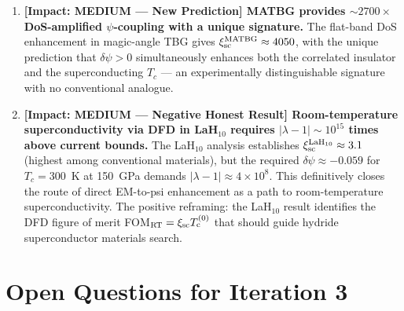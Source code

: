 \documentclass[11pt]{article}
\newcommand{\ee}[1]{\times 10^{#1}}
\newcommand{\Tc}{T_{\rm c}}
\begin{document}
\begin{enumerate}[leftmargin=*]
\item \textbf{[Impact: MEDIUM --- New Prediction] MATBG provides $\sim 2700\times$
  DoS-amplified $\psi$-coupling with a unique signature.}
  The flat-band DoS enhancement in magic-angle TBG gives
  $\xi_{\rm sc}^{\rm MATBG} \approx 4050$, with the unique prediction
  that $\delta\psi > 0$ simultaneously enhances both the correlated insulator
  and the superconducting $T_c$ --- an experimentally distinguishable signature
  with no conventional analogue.

\item \textbf{[Impact: MEDIUM --- Negative Honest Result] Room-temperature
  superconductivity via DFD in LaH$_{10}$ requires $|\lambda-1| \sim 10^{15}$
  times above current bounds.}
  The LaH$_{10}$ analysis establishes $\xi_{\rm sc}^{\rm LaH_{10}} \approx 3.1$
  (highest among conventional materials), but the required $\delta\psi \approx -0.059$
  for $T_c = 300$~K at 150~GPa demands $|\lambda-1| \approx 4\ee{8}$.
  This definitively closes the route of direct EM-to-psi enhancement as a path
  to room-temperature superconductivity. The positive reframing: the LaH$_{10}$
  result identifies the DFD figure of merit FOM$_{\rm RT} = \xi_{\rm sc}\Tc^{(0)}$
  that should guide hydride superconductor materials search.
\end{enumerate}

\section{Open Questions for Iteration 3}
\label{sec:open}
\end{document}
